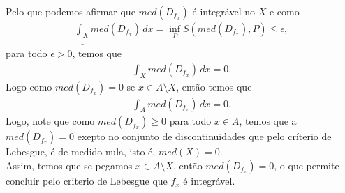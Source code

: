 \begin{homeworkProblem}[Seção 4-3]
\begin{solution}
    Pelo que podemos afirmar que $med(D_{f_x})$ é integrável no $X$ e como
    \begin{align*}
      \underline{\int_{X}}med(D_{f_x})\,dx=\inf_{P}S(med(D_{f_x}),P)\leq \epsilon,
    \end{align*}
    para todo $\epsilon>0$, temos que
    \begin{align*}
      \int_{X}med(D_{f_x})\,dx=0.
    \end{align*}
    Logo como $med(D_{f_x})=0$ se $x\in A\setminus X$, então temos que
    \begin{align*}
      \int_{A}med(D_{{f_x}})\,dx=0.
    \end{align*}
    Logo, note que como $med(D_{f_x})\geq 0$ para todo $x\in A$, temos que a $med(D_{f_x})=0$ exepto no conjunto de discontinuidades que pelo críterio de Lebesgue, é de medido nula, isto é, $med(X)=0$.\\
    Assim, temos que se pegamos $x\in A\setminus X$, então $med(D_{f_x})=0$, o que permite concluir pelo criterio de Lebesgue que $f_x$ é integrável. 
  \end{solution}
\end{homeworkProblem}
